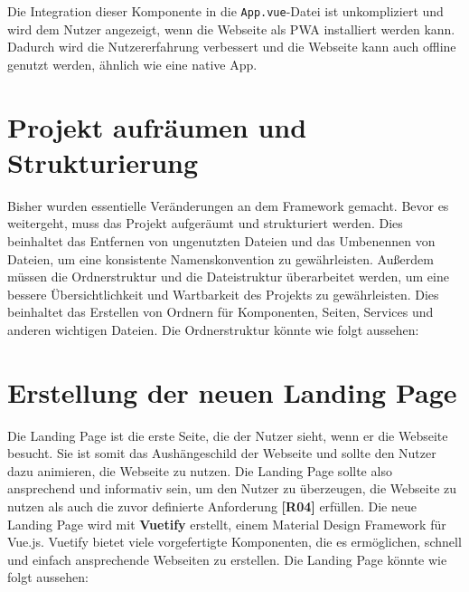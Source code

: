 Die Integration dieser Komponente in die \texttt{App.vue}-Datei ist unkompliziert und wird dem Nutzer angezeigt, wenn die Webseite als \acs{PWA} installiert werden kann. Dadurch wird die Nutzererfahrung verbessert und die Webseite kann auch offline genutzt werden, ähnlich wie eine native App. \cite{vite-plugin-pwa}

\section{Projekt aufräumen und Strukturierung}

Bisher wurden essentielle Veränderungen an dem Framework gemacht.
Bevor es weitergeht, muss das Projekt aufgeräumt und strukturiert werden.
Dies beinhaltet das Entfernen von ungenutzten Dateien und das Umbenennen von Dateien, um eine konsistente Namenskonvention zu gewährleisten.
Außerdem müssen die Ordnerstruktur und die Dateistruktur überarbeitet werden, um eine bessere Übersichtlichkeit und Wartbarkeit des Projekts zu gewährleisten.
Dies beinhaltet das Erstellen von Ordnern für Komponenten, Seiten, Services und anderen wichtigen Dateien.
Die Ordnerstruktur könnte wie folgt aussehen:




\section{Erstellung der neuen Landing Page}

Die Landing Page ist die erste Seite, die der Nutzer sieht, wenn er die Webseite besucht.
Sie ist somit das Aushängeschild der Webseite und sollte den Nutzer dazu animieren, die Webseite zu nutzen.
Die Landing Page sollte also ansprechend und informativ sein, um den Nutzer zu überzeugen, die Webseite zu nutzen als auch die zuvor definierte Anforderung \textbf{[R04]} erfüllen.
Die neue Landing Page wird mit \textbf{Vuetify} erstellt, einem Material Design Framework für Vue.js.
Vuetify bietet viele vorgefertigte Komponenten, die es ermöglichen, schnell und einfach ansprechende Webseiten zu erstellen.
Die Landing Page könnte wie folgt aussehen:

